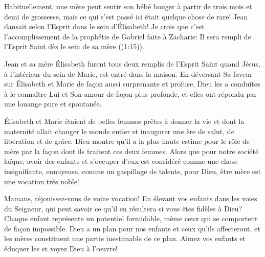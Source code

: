 


Habituellement, une mère peut sentir son bébé bouger à partir de trois mois et demi de grossesse, mais ce qui s'est passé ici était quelque chose de rare! Jean dansait selon l'Esprit dans le sein d'Élisabeth! Je crois que c'est l'accomplissement de la prophétie de Gabriel faite à Zacharie: \og Il sera rempli de l’Esprit Saint dès le sein de sa mère \fg{} ((1:15)).

Jean et sa mère Élisabeth furent tous deux remplis de l'Esprit Saint quand Jésus, à l'intérieur du sein de Marie, est entré dans la maison. En déversant Sa faveur sur Élisabeth et Marie de façon aussi surprenante et profuse, Dieu les a conduites à le connaître Lui et Son amour de façon plus profonde, et elles ont répondu par une louange pure et spontanée.

Élisabeth et Marie étaient de belles femmes prêtes à donner la vie et dont la maternité allait changer le monde entier et inaugurer une ère de salut, de libération et de grâce. Dieu montre qu'il a la plus haute estime pour le rôle de mère par la façon dont ils traitent ces deux femmes. Alors que pour notre société laïque, avoir des enfants et s'occuper d'eux est considéré comme une chose insignifiante, ennuyeuse, comme un gaspillage de talents, pour Dieu, être mère est une vocation très noble!

Mamans, réjouissez-vous de votre vocation! En élevant vos enfants dans les voies du Seigneur, qui peut savoir ce qu'il en résultera si vous êtes fidèles à Dieu? Chaque enfant représente un potentiel formidable, même ceux qui se comportent de façon impossible. Dieu a un plan pour nos enfants et ceux qu'ils affecteront, et les mères constituent une partie inestimable de ce plan. Aimez vos enfants et éduquer les et voyez Dieu à l'œuvre!



